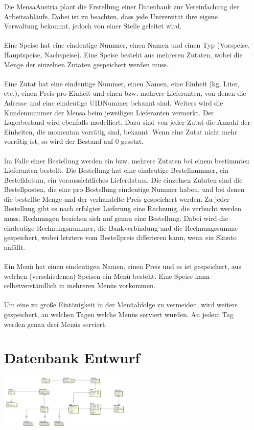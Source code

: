 \documentclass[12pt,a4paper,draft]{report}
\begin{document}
	Die MensaAustria plant die Erstellung einer Datenbank zur Vereinfachung der Arbeitsabläufe. Dabei
	ist zu beachten, dass jede Universität ihre eigene Verwaltung bekommt, jedoch von einer Stelle
	geleitet wird.\\\\
	Eine Speise hat eine eindeutige Nummer, einen Namen und einen Typ (Vorspeise, Hauptspeise,
	Nachspeise). Eine Speise besteht aus mehreren Zutaten, wobei die Menge der einzelnen Zutaten
	gespeichert werden muss.\\\\
	Eine Zutat hat eine eindeutige Nummer, einen Namen, eine Einheit (kg, Liter, etc.), einen Preis pro
	Einheit und einen bzw. mehrere Lieferanten, von denen die Adresse und eine eindeutige
	UIDNummer bekannt sind. Weiters wird die Kundennummer der Mensa beim jeweiligen Lieferanten
	vermerkt. Der Lagerbestand wird ebenfalls modelliert. Dazu sind von jeder Zutat die Anzahl der
	Einheiten, die momentan vorrätig sind, bekannt. Wenn eine Zutat nicht mehr vorrätig ist, so wird der
	Bestand auf 0 gesetzt.\\\\
	Im Falle einer Bestellung werden ein bzw. mehrere Zutaten bei einem bestimmten Lieferanten
	bestellt. Die Bestellung hat eine eindeutige Bestellnummer, ein Bestelldatum, ein voraussichtliches
	Lieferdatum. Die einzelnen Zutaten sind die Bestellposten, die eine pro Bestellung eindeutige
	Nummer haben, und bei denen die bestellte Menge und der verhandelte Preis gespeichert werden.
	Zu jeder Bestellung gibt es nach erfolgter Lieferung eine Rechnung, die verbucht werden muss.
	Rechnungen beziehen sich auf genau eine Bestellung. Dabei wird die eindeutige Rechnungsnummer,
	die Bankverbindung und die Rechnungssumme gespeichert, wobei letztere vom Bestellpreis
	differieren kann, wenn ein Skonto anfällt.\\\\
	Ein Menü hat einen eindeutigen Namen, einen Preis und es ist gespeichert, aus welchen
	(verschiedenen) Speisen ein Menü besteht. Eine Speise kann selbstverständlich in mehreren Menüs
	vorkommen.\\\\
	Um eine zu große Eintönigkeit in der Menüabfolge zu vermeiden, wird weiters gespeichert, an
	welchen Tagen welche Menüs serviert wurden. An jedem Tag werden genau drei Menüs serviert.
	\chapter{Datenbank Entwurf}
	\includegraphics[width=0.5\textwidth]{ERD/MensaEr.png}
\end{document}
